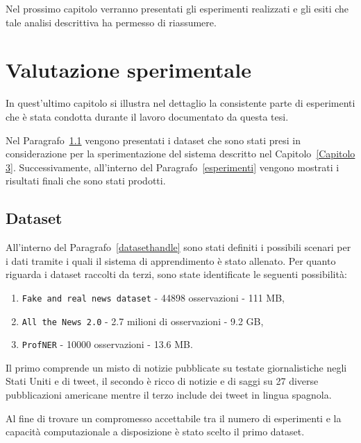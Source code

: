 \documentclass[12pt]{report}
\theoremstyle{definition}
\begin{document}
Nel prossimo capitolo verranno presentati gli esperimenti realizzati e gli esiti che tale analisi descrittiva ha permesso di riassumere.

\chapter{Valutazione sperimentale}
\label{Capitolo 4}
\onehalfspacing
In quest'ultimo capitolo si illustra nel dettaglio la consistente parte di esperimenti che è stata condotta durante il lavoro documentato da questa tesi.

Nel Paragrafo~\ref{dataset} vengono presentati i dataset che sono stati presi in considerazione per la sperimentazione del sistema descritto nel Capitolo~\ref{Capitolo 3}. Successivamente, all'interno del Paragrafo~\ref{esperimenti} vengono mostrati i risultati finali che sono stati prodotti.

\section{Dataset}\label{dataset}
All'interno del Paragrafo~\ref{datasethandle} sono stati definiti i possibili scenari per i dati tramite i quali il sistema di apprendimento è stato allenato. Per quanto riguarda i dataset raccolti da terzi, sono state identificate le seguenti possibilità:
\begin{enumerate}
    \item \texttt{Fake and real news dataset} - 44898 osservazioni - 111 MB,
    \item \texttt{All the News 2.0} - 2.7 milioni di osservazioni - 9.2 GB,
    \item \texttt{ProfNER} - 10000 osservazioni - 13.6 MB.
\end{enumerate}
Il primo comprende un misto di notizie pubblicate su testate giornalistiche negli Stati Uniti e di tweet, il secondo è ricco di notizie e di saggi su 27 diverse pubblicazioni americane mentre il terzo include dei tweet in lingua spagnola.

Al fine di trovare un compromesso accettabile tra il numero di esperimenti e la capacità computazionale a disposizione è stato scelto il primo dataset.
\end{document}
